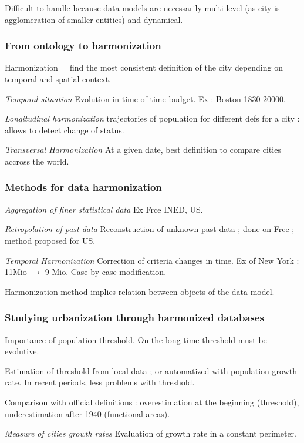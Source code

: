 Difficult to handle because data models are necessarily multi-level (as city is agglomeration of smaller entities) and dynamical.

\subsubsection{From ontology to harmonization}

Harmonization = find the most consistent definition of the city depending on temporal and spatial context.

\textit{Temporal situation} Evolution in time of time-budget. Ex : Boston 1830-20000.

\textit{Longitudinal harmonization} trajectories of population for different defs for a city : allows to detect change of status.

\textit{Transversal Harmonization} At a given date, best definition to compare cities accross the world.


\subsubsection{Methods for data harmonization}

\textit{Aggregation of finer statistical data} Ex Frce INED, US.

\textit{Retropolation of past data} Reconstruction of unknown past data ; done on Frce ; method proposed for US.

\textit{Temporal Harmonization} Correction of criteria changes in time. Ex of New York : 11Mio $\rightarrow$ 9 Mio. Case by case modification.

Harmonization method implies relation between objects of the data model.


\subsubsection{Studying urbanization through harmonized databases}

Importance of population threshold. On the long time threshold must be evolutive.

Estimation of threshold from local data ; or automatized with population growth rate. In recent periods, less problems with threshold.

Comparison with official definitions : overestimation at the beginning (threshold), underestimation after 1940 (functional areas).

\textit{Measure of cities growth rates} Evaluation of growth rate in a constant perimeter.










